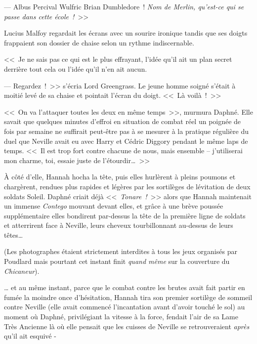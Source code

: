 --- Albus Percival Wulfric Brian Dumbledore~! \emph{Nom de Merlin, qu'est-ce qui se passe dans cette école~!}~>>

Lucius Malfoy regardait les écrans avec un sourire ironique tandis que ses doigts frappaient son dossier de chaise selon un rythme indiscernable.

<<~Je ne sais pas ce qui est le plus effrayant, l'idée qu'il ait un plan secret derrière tout cela ou l'idée qu'il n'en ait aucun.

--- Regardez~!~>> s'écria Lord Greengrass. Le jeune homme soigné s'était à moitié levé de sa chaise et pointait l'écran du doigt. <<~Là voilà~!~>>

\later

<<~On va l'attaquer toutes les deux en même temps~>>, murmura Daphné. Elle savait que quelques minutes d'effroi en situation de combat réel un poignée de fois par semaine ne suffirait peut-être pas à se mesurer à la pratique régulière du duel que Neville avait eu avec Harry et Cédric Diggory pendant le même laps de temps. <<~Il est trop fort contre chacune de nous, mais ensemble -- j'utiliserai mon charme, toi, essaie juste de l'étourdir…~>>

À côté d'elle, Hannah hocha la tête, puis elles hurlèrent à pleins poumons et chargèrent, rendues plus rapides et légères par les sortilèges de lévitation de deux soldats Soleil. Daphné criait déjà <<~\emph{Tonare~!}~>> alors que Hannah maintenait un immense \emph{Contego} mouvant devant elles, et grâce à une brève poussée supplémentaire elles bondirent par-dessus la tête de la première ligne de soldats et atterrirent face à Neville, leurs cheveux tourbillonnant au-dessus de leurs têtes…

(Les photographes étaient strictement interdites à tous les jeux organisés par Poudlard mais pourtant cet instant finit \emph{quand même} sur la couverture du \emph{Chicaneur}).

… et au même instant, parce que le combat contre les brutes avait fait partir en fumée la moindre once d'hésitation, Hannah tira son premier sortilège de sommeil contre Neville (elle avait commencé l'incantation avant d'avoir touché le sol) au moment où Daphné, privilégiant la vitesse à la force, fendait l'air de sa Lame Très Ancienne là où elle pensait que les cuisses de Neville se retrouveraient \emph{après} qu'il ait esquivé -

